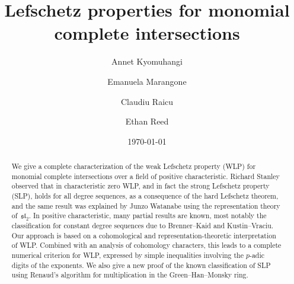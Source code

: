 \documentclass[11pt,reqno]{amsart}
\newcommand{\mf}[1]{\mathfrak{#1}}
\theoremstyle{definition}
\theoremstyle{remark}
\numberwithin{equation}{section}
\begin{document}
\title{Lefschetz properties for monomial complete intersections}

\author{Annet Kyomuhangi}
\address{Department of Mathematics, Busitema University, P.O. Box 236, Tororo}

\author{Emanuela Marangone}
\address{Dipartimento di Matematica, Università degli Studi di Genova, Via Dodecaneso, 35, 16146 Genova, Italy \newline
\indent CIMAT - Centro de Investigación en Matemáticas, Valenciana, 36023 Guanajuato, Mexico}

\author{Claudiu Raicu}
\address{Department of Mathematics, University of Notre Dame, 255 Hurley, Notre Dame, IN 46556\newline
\indent Institute of Mathematics ``Simion Stoilow'' of the Romanian Academy}

\author{Ethan Reed}
\address{Academy of Mathematics and Systems Science, Chinese Academy of Sciences, No. 55 Zhongguancun
East Road, Beijing, 100190, China.}




\date{\today}


\begin{abstract} 
We give a complete characterization of the weak Lefschetz property (WLP) for monomial complete intersections over a field of positive characteristic. Richard Stanley observed that in characteristic zero WLP, and in fact the strong Lefschetz property (SLP), holds for all degree sequences, as a consequence of the hard Lefschetz theorem, and the same result was explained by Junzo Watanabe using the representation theory of~$\mf{sl}_2$. In positive characteristic, many partial results are known, most notably the classification for constant degree sequences due to Brenner--Kaid and Kustin--Vraciu. Our approach is based on a cohomological and representation-theoretic interpretation of WLP. Combined with an analysis of cohomology characters, this leads to a complete numerical criterion for WLP, expressed by simple inequalities involving the $p$-adic digits of the exponents. We also give a new proof of the known classification of SLP using Renaud’s algorithm for multiplication in the Green--Han--Monsky ring.
\end{abstract}
\end{document}
